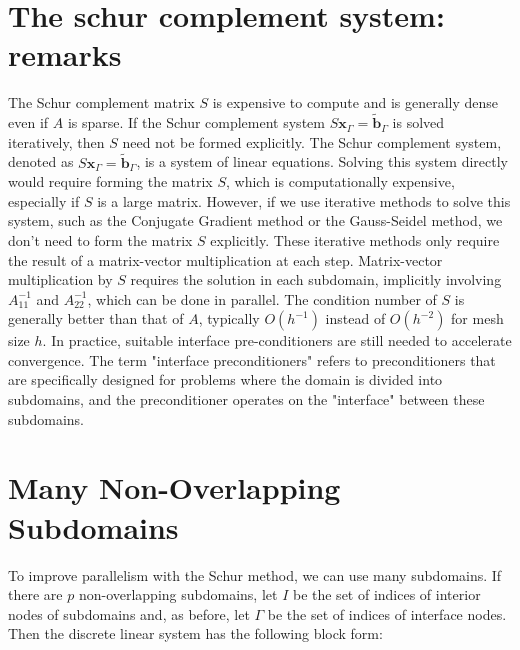 \documentclass[11pt]{book}
\begin{document}
\section*{The schur complement system: remarks}
The Schur complement matrix $S$ is expensive to compute and is generally dense even if $A$ is sparse. If the Schur complement system $S \mathbf{x}_{\Gamma}=\widetilde{\mathbf{b}}_{\Gamma}$ is solved iteratively, then $S$ need not be formed explicitly.
The Schur complement system, denoted as $S \mathbf{x}_{\Gamma}=\widetilde{\mathbf{b}}_{\Gamma}$, is a system of linear equations. Solving this system directly would require forming the matrix $S$, which is computationally expensive, especially if $S$ is a large matrix.
However, if we use iterative methods to solve this system, such as the Conjugate Gradient method or the Gauss-Seidel method, we don't need to form the matrix $S$ explicitly. These iterative methods only require the result of a matrix-vector multiplication at each step.
Matrix-vector multiplication by $S$ requires the solution in each subdomain, implicitly involving $A_{11}^{-1}$ and $A_{22}^{-1}$, which can be done in parallel. The condition number of $S$ is generally better than that of $A$, typically $O\left(h^{-1}\right)$ instead of $O\left(h^{-2}\right)$ for mesh size $h$. In practice, suitable interface pre-conditioners are still needed to accelerate convergence. The term "interface preconditioners" refers to preconditioners that are specifically designed for problems where the domain is divided into subdomains, and the preconditioner operates on the "interface" between these subdomains. 


\section*{Many Non-Overlapping Subdomains}
To improve parallelism with the Schur method, we can use many subdomains. If there are $p$ non-overlapping subdomains, let $I$ be the set of indices of interior nodes of subdomains and, as before, let $\Gamma$ be the set of indices of interface nodes. Then the discrete linear system has the following block form: \\
\end{document}
